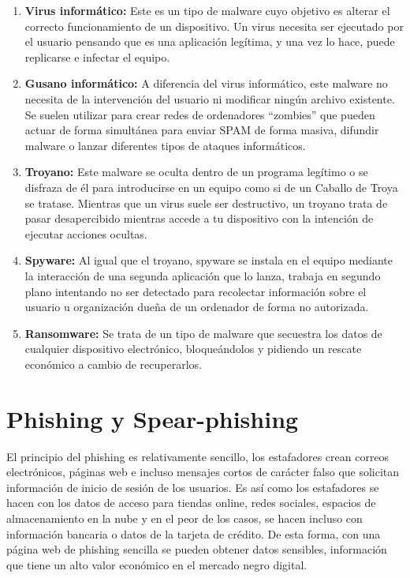 \begin{enumerate}

\item {\bfseries Virus informático:}
Este es un tipo de malware cuyo objetivo es alterar el correcto funcionamiento de un dispositivo. Un virus necesita ser ejecutado por el usuario pensando que es una aplicación legítima, y una vez lo hace, puede replicarse e infectar el equipo.

\item {\bfseries Gusano informático:}
A diferencia del virus informático, este malware no necesita de la intervención del usuario ni modificar ningún archivo existente. Se suelen utilizar para crear redes de ordenadores “zombies” que pueden actuar de forma simultánea para enviar SPAM de forma masiva, difundir malware o lanzar diferentes tipos de ataques informáticos.

\item {\bfseries Troyano:}
Este malware se oculta dentro de un programa legítimo o se disfraza de él para introducirse en un equipo como si de un Caballo de Troya se tratase. Mientras que un virus suele ser destructivo, un troyano trata de pasar desapercibido mientras accede a tu dispositivo con la intención de ejecutar acciones ocultas.

\item {\bfseries Spyware:}
Al igual que el troyano, spyware se instala en el equipo mediante la interacción de una segunda aplicación que lo lanza, trabaja en segundo plano intentando no ser detectado para recolectar información sobre el usuario u organización dueña de un ordenador de forma no autorizada.

\item {\bfseries Ransomware:}
Se trata de un tipo de malware que secuestra los datos de cualquier dispositivo electrónico, bloqueándolos y pidiendo un rescate económico a cambio de recuperarlos.

\nocite{malware}

\end{enumerate}


\section{Phishing y Spear-phishing}
\label{sec:phishing-spear-phishing}

El principio del phishing es relativamente sencillo, los estafadores crean correos electrónicos, páginas web e incluso mensajes cortos de carácter falso 
que solicitan información de inicio de sesión de los usuarios. Es así como los estafadores se hacen con los datos de acceso para tiendas online, redes 
sociales, espacios de almacenamiento en la nube y en el peor de los casos, se hacen incluso con información bancaria o datos de la tarjeta de crédito. 
De esta forma, con una página web de phishing sencilla se pueden obtener datos sensibles, información que tiene un alto valor económico en el mercado 
negro digital.


